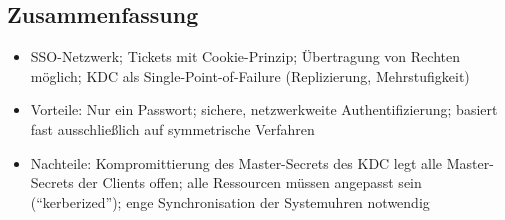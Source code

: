 \subsection{Zusammenfassung}
\begin{itemize}
	\item SSO-Netzwerk; Tickets mit Cookie-Prinzip; Übertragung von Rechten möglich; KDC als Single-Point-of-Failure (Replizierung, Mehrstufigkeit)
	\item Vorteile: Nur ein Passwort; sichere, netzwerkweite Authentifizierung; basiert fast ausschließlich auf symmetrische Verfahren
	\item Nachteile: Kompromittierung des Master-Secrets des KDC legt alle Master-Secrets der Clients offen; alle Ressourcen müssen angepasst sein ("`kerberized"'); enge Synchronisation der Systemuhren notwendig
\end{itemize}



